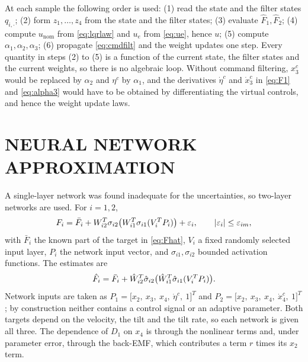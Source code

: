 \begin{remark}
\label{rem:order}
At each sample the following order is used:
(1) read the state and the filter states $q_{i,\cdot}$;
(2) form $z_1,\dots,z_4$ from the state and the filter states;
(3) evaluate $\hat F_1,\hat F_2$;
(4) compute $u_{\mathrm{nom}}$ from \eqref{eq:lqrlaw} and $u_e$ from
\eqref{eq:ue}, hence $u$;
(5) compute $\alpha_1,\alpha_2,\alpha_3$;
(6) propagate \eqref{eq:cmdfilt} and the weight updates one step.
Every quantity in steps (2) to (5) is a function of the current state, the
filter states and the current weights, so there is no algebraic loop. Without
command filtering, $x_3^c$ would be replaced by $\alpha_2$ and $\eta^c$ by
$\alpha_1$, and the derivatives $\dot\eta^c$ and $\dot x_3^c$ in
\eqref{eq:F1} and \eqref{eq:alpha3} would have to be obtained by
differentiating the virtual controls, and hence the weight update laws.
\end{remark}

\section{NEURAL NETWORK APPROXIMATION}
\label{sec:nn}

A single-layer network was found inadequate for the uncertainties, so two-layer
networks are used. For $i=1,2$,
\begin{equation}\label{eq:nn2layer}
F_i=\bar F_i+W_{i2}^T\sigma_{i2}\bigl(W_{i1}^T\sigma_{i1}(V_i^TP_i)\bigr)+\varepsilon_i,
\qquad \left\lvert \varepsilon_i \right\rvert\le\varepsilon_{im},
\end{equation}
with $\bar F_i$ the known part of the target in \eqref{eq:Fhat}, $V_i$ a fixed
randomly selected input layer, $P_i$ the network input vector, and
$\sigma_{i1},\sigma_{i2}$ bounded activation functions. The estimates are
\begin{equation}\label{eq:nnhat}
\hat F_i=\bar F_i+\hat{W}_{i2}^T\hat\sigma_{i2}
\bigl(\hat{W}_{i1}^T\hat\sigma_{i1}(V_i^TP_i)\bigr).
\end{equation}
Network inputs are taken as
$P_1=\bigl[x_2,\ x_3,\ x_4,\ \dot\eta^c,\ 1\bigr]^T$ and
$P_2=\bigl[x_2,\ x_3,\ x_4,\ \dot x_4^c,\ 1\bigr]^T$; by construction neither
contains a control signal or an adaptive parameter. Both targets depend on the
velocity, the tilt and the tilt rate, so each network is given all three. The
dependence of $D_1$ on $x_4$ is through the nonlinear terms and, under
parameter error, through the back-EMF, which contributes a term $r$ times its
$x_2$ term.

